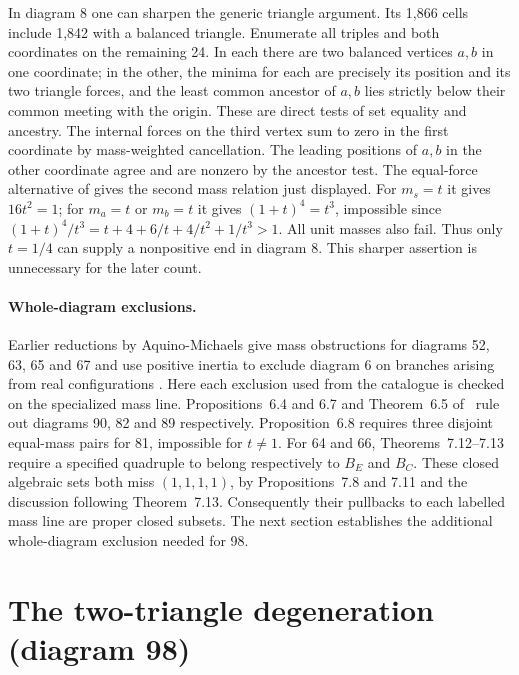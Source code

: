\documentclass[11pt,letterpaper]{article}
\theoremstyle{definition}
\begin{document}
In diagram 8 one can sharpen the generic triangle argument. Its 1,866 cells
include 1,842 with a balanced triangle. Enumerate all triples and both
coordinates on the remaining 24. In each there are two balanced vertices
$a,b$ in one coordinate; in the other, the minima for each are precisely
its position and its two triangle forces, and the least common ancestor of
$a,b$ lies strictly below their common meeting with the origin. These are
direct tests of set equality and ancestry. The internal forces on the
third vertex sum to zero in the first coordinate by mass-weighted
cancellation. The leading positions of $a,b$ in the other coordinate
agree and are nonzero by the ancestor test. The equal-force alternative of
\cite[Thm.~9.9(ii)]{Tomar} gives the second mass relation just displayed.
For $m_s=t$ it gives $16t^2=1$; for $m_a=t$ or $m_b=t$ it gives
$(1+t)^4=t^3$, impossible since $(1+t)^4/t^3=t+4+6/t+4/t^2+1/t^3>1$.
All unit masses also fail. Thus only $t=1/4$ can supply a nonpositive
end in diagram 8. This sharper assertion is unnecessary for the later count.

\paragraph{Whole-diagram exclusions.}
Earlier reductions by Aquino-Michaels give mass obstructions for diagrams 52, 63, 65 and 67 and use positive inertia to exclude diagram 6 on branches arising from real configurations \cite{Residual}. Here each exclusion used from the catalogue is checked on the specialized mass line.
Propositions~6.4 and 6.7 and Theorem~6.5 of~\cite{Tomar} rule out
diagrams 90, 82 and 89 respectively. Proposition~6.8 requires three
disjoint equal-mass pairs for 81, impossible for $t\ne1$.
For 64 and 66, Theorems~7.12--7.13 require a specified quadruple to
belong respectively to $B_E$ and $B_C$. These closed algebraic sets
both miss $(1,1,1,1)$, by Propositions~7.8 and 7.11 and the discussion
following Theorem~7.13. Consequently their pullbacks to each labelled
mass line are proper closed subsets. The next section establishes the
additional whole-diagram exclusion needed for 98.

\section{The two-triangle degeneration (diagram 98)}\label{early:98}
\end{document}
